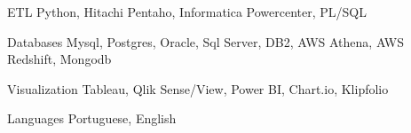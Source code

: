 

\begin{cvskills}

  \cvskill
    {ETL} %
    {Python, Hitachi Pentaho, Informatica Powercenter, PL/SQL} %

  \cvskill
    {Databases} %
    {Mysql, Postgres, Oracle, Sql Server, DB2, AWS Athena, AWS Redshift, Mongodb} %

  \cvskill
    {Visualization} %
    {Tableau, Qlik Sense/View, Power BI, Chart.io, Klipfolio} %


  \cvskill
    {Languages} %
    {Portuguese, English} %

\end{cvskills}
